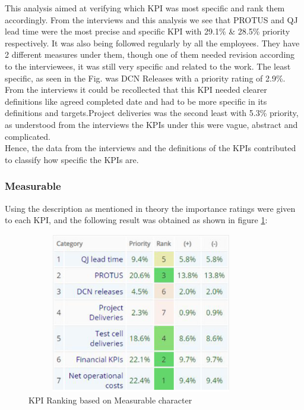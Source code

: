 This analysis aimed at verifying which KPI was most specific and rank them accordingly. From the interviews and this analysis we see that PROTUS and QJ lead time were the most precise and specific KPI with 29.1\% & 28.5\% priority respectively. It was also being followed regularly by all the employees. They have 2 different measures under them, though one of them needed revision according to the interviewees, it was still very specific and related to the work. 
The least specific, as seen in the Fig. was DCN Releases with a priority rating of 2.9\%. From the interviews it could be recollected that this KPI needed clearer definitions like agreed completed date and had to be more specific in its definitions and targets.Project deliveries was the second least with 5.3\% priority, as understood from the interviews the KPIs under this were vague, abstract and complicated. \\
Hence, the data from the interviews and the definitions of the KPIs contributed to classify how specific the KPIs are.\\

\subsubsection{Measurable}
Using the description as mentioned in theory the importance ratings were given to each KPI, and the following result was obtained as shown in figure \ref{fig:6.2}:\\

\begin{figure}[H]
    \centering
    \captionsetup{justification=centering, margin=2cm}
    \vspace{1cm}
    \includegraphics[width=10cm, height=7cm]{figure/auxiliary/fig62.PNG}
    \caption{KPI Ranking based on Measurable character}
    \label{fig:6.2}
\end{figure}

